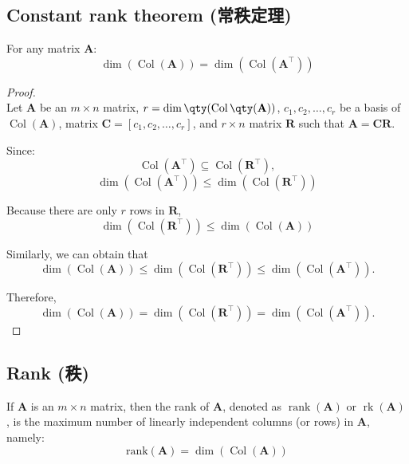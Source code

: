 \documentclass[a4paper,12pt]{report}
\begin{document}
\subsection{Constant rank theorem (常秩定理)}
For any matrix $\mathbf{A}$:  \[\dim(\operatorname{Col}(\mathbf{A}))=\dim(\operatorname{Col}(\mathbf{A}^\top))\]
\begin{proof}\mbox{}\\
Let $\mathbf{A}$ be an $m\times n$ matrix, $r=\dim\qty(\operatorname{Col}\qty(\mathbf{A}))$, $ c_{1},c_{2},\ldots ,c_{r}$ be a basis of $\operatorname{Col}(\mathbf{A})$, matrix $\mathbf{C}=[c_{1},c_{2},\ldots ,c_{r}]$, and $r\times n$ matrix $\mathbf{R}$ such that $\mathbf{A}=\mathbf{C}\mathbf{R}$. 

Since:
\[\operatorname{Col}(\mathbf{A}^\top)\subseteq\operatorname{Col}(\mathbf{R}^\top),\]
\[\dim(\operatorname{Col}(\mathbf{A}^\top))\leq\dim(\operatorname{Col}(\mathbf{R}^\top))\]

Because there are only $r$ rows in $\mathbf{R}$,
\[\dim(\operatorname{Col}(\mathbf{R}^\top))\leq\dim(\operatorname{Col}(\mathbf{A}))\]

Similarly, we can obtain that
\[\dim(\operatorname{Col}(\mathbf{A}))\leq\dim(\operatorname{Col}(\mathbf{R}^\top))\leq\dim(\operatorname{Col}(\mathbf{A}^\top)).\]

Therefore,
\[\dim(\operatorname{Col}(\mathbf{A}))=\dim(\operatorname{Col}(\mathbf{R}^\top))=\dim(\operatorname{Col}(\mathbf{A}^\top)).\]
\end{proof}
\subsection{Rank (秩)}
If $ \mathbf{A} $ is an \( m \times n \) matrix, then the rank of \( \mathbf{A} \), denoted as \( \operatorname{rank}(\mathbf{A}) \) or $\operatorname{rk}(\mathbf{A})$, is the maximum number of linearly independent columns (or rows) in \( \mathbf{A} \), namely:
\[\text{rank}(\mathbf{A})=\dim(\operatorname{Col}(\mathbf{A}))\]
\end{document}
